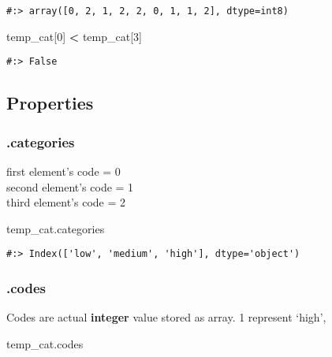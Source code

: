 \documentclass[
]{book}
\newenvironment{Shaded}{\begin{snugshade}}{\end{snugshade}}
\newcommand{\DecValTok}[1]{\textcolor[rgb]{0.06,0.06,0.06}{#1}}
\newcommand{\NormalTok}[1]{#1}
\newcommand{\OperatorTok}[1]{\textcolor[rgb]{0.43,0.43,0.43}{\textbf{#1}}}
\begin{document}
\begin{verbatim}
#:> array([0, 2, 1, 2, 2, 0, 1, 1, 2], dtype=int8)
\end{verbatim}

\begin{Shaded}
\begin{Highlighting}[]
\NormalTok{temp\_cat[}\DecValTok{0}\NormalTok{] }\OperatorTok{\textless{}}\NormalTok{ temp\_cat[}\DecValTok{3}\NormalTok{]}
\end{Highlighting}
\end{Shaded}

\begin{verbatim}
#:> False
\end{verbatim}

\hypertarget{properties}{%
\subsection{Properties}\label{properties}}

\hypertarget{categories}{%
\subsubsection{.categories}\label{categories}}

first element's code = 0\\
second element's code = 1\\
third element's code = 2

\begin{Shaded}
\begin{Highlighting}[]
\NormalTok{temp\_cat.categories}
\end{Highlighting}
\end{Shaded}

\begin{verbatim}
#:> Index(['low', 'medium', 'high'], dtype='object')
\end{verbatim}

\hypertarget{codes}{%
\subsubsection{.codes}\label{codes}}

Codes are actual \textbf{integer} value stored as array. 1 represent `high',

\begin{Shaded}
\begin{Highlighting}[]
\NormalTok{temp\_cat.codes}
\end{Highlighting}
\end{Shaded}
\end{document}
